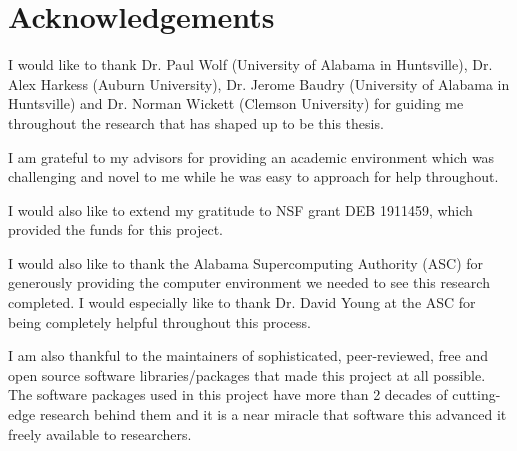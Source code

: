 \chapter{Acknowledgements}
\doublespacing
I would like to thank Dr. Paul Wolf (University of Alabama in Huntsville), Dr. Alex Harkess (Auburn University), Dr. Jerome Baudry (University of Alabama in Huntsville) and Dr. Norman Wickett (Clemson University) for guiding me throughout the research that has shaped up to be this thesis.

I am grateful to my advisors for providing an academic environment which was challenging and novel to me while he was easy to approach for help throughout.

I would also like to extend my gratitude to NSF grant DEB 1911459, which provided the funds for this project.

I would also like to thank the Alabama Supercomputing Authority (ASC) for generously providing the computer environment we needed to see this research completed. I would especially like to thank Dr. David Young at the ASC for being completely helpful throughout this process.

I am also thankful to the maintainers of sophisticated, peer-reviewed, free and open source software libraries/packages that made this project at all possible. The software packages used in this project have more than 2 decades of cutting-edge research behind them and it is a near miracle that software this advanced it freely available to researchers.

